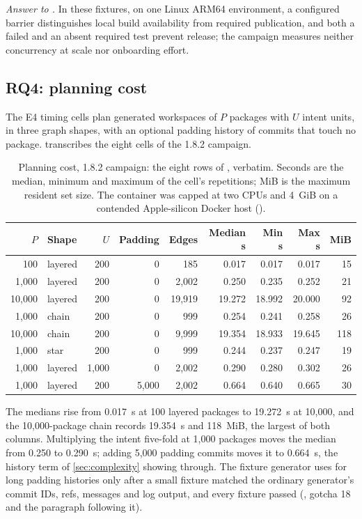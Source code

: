 \emph{Answer to .} In these fixtures, on one Linux ARM64 environment,
a configured barrier distinguishes local build availability from required
publication, and both a failed and an absent required test prevent release;
the campaign measures neither concurrency at scale nor onboarding effort.

\subsection{RQ4: planning cost}
\label{sec:eval:rq4}

The E4 timing cells plan generated workspaces of $P$ packages with $U$ intent
units, in three graph shapes, with an optional padding history of commits that
touch no package.  transcribes the eight cells of the 1.8.2
campaign.

\begin{table}[ht]
\centering\footnotesize
\caption{Planning cost, 1.8.2 campaign: the eight rows of
\protect{}, verbatim. Seconds
are the median, minimum and maximum of the cell's repetitions; MiB is the
maximum resident set size. The container was capped at two CPUs and 4~GiB on a
contended Apple-silicon Docker host
(\protect{}).}
\label{tab:eval:rq4}
\begin{tabular}{@{}rlrrrrrrr@{}}
\toprule
$P$ & Shape & $U$ & Padding & Edges & Median s & Min s & Max s & MiB \\
\midrule
100 & layered & 200 & 0 & 185 & 0.017 & 0.017 & 0.017 & 15 \\
1,000 & layered & 200 & 0 & 2,002 & 0.250 & 0.235 & 0.252 & 21 \\
10,000 & layered & 200 & 0 & 19,919 & 19.272 & 18.992 & 20.000 & 92 \\
1,000 & chain & 200 & 0 & 999 & 0.254 & 0.241 & 0.258 & 26 \\
10,000 & chain & 200 & 0 & 9,999 & 19.354 & 18.933 & 19.645 & 118 \\
1,000 & star & 200 & 0 & 999 & 0.244 & 0.237 & 0.247 & 19 \\
1,000 & layered & 1,000 & 0 & 2,002 & 0.290 & 0.280 & 0.302 & 26 \\
1,000 & layered & 200 & 5,000 & 2,002 & 0.664 & 0.640 & 0.665 & 30 \\
\bottomrule
\end{tabular}
\end{table}

The medians rise from 0.017~s at 100 layered packages to 19.272~s at 10,000,
and the 10,000-package chain records 19.354~s and 118~MiB, the largest of
both columns. Multiplying the intent five-fold at 1,000 packages moves the
median from 0.250 to 0.290~s; adding 5,000 padding commits moves it to
0.664~s, the history term of \cref{sec:complexity} showing through. The
fixture generator uses  for long padding histories only
after a small fixture matched the ordinary generator's commit IDs, refs,
messages and log output, and every fixture passed 
(, gotcha 18 and the paragraph following it).

